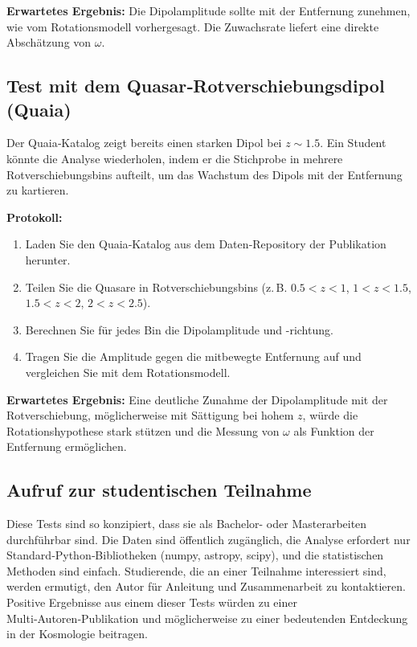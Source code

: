 \documentclass[11pt,a4paper]{article}
\begin{document}
	\textbf{Erwartetes Ergebnis:} Die Dipolamplitude sollte mit der Entfernung zunehmen, wie vom Rotationsmodell vorhergesagt. Die Zuwachsrate liefert eine direkte Abschätzung von \(\omega\).
	
	\subsection{Test mit dem Quasar‑Rotverschiebungsdipol (Quaia)}
	
	Der Quaia‑Katalog \cite{Secrest2025} zeigt bereits einen starken Dipol bei \(z\sim1.5\). Ein Student könnte die Analyse wiederholen, indem er die Stichprobe in mehrere Rotverschiebungsbins aufteilt, um das Wachstum des Dipols mit der Entfernung zu kartieren.
	
	\textbf{Protokoll:}
	\begin{enumerate}
		\item Laden Sie den Quaia‑Katalog aus dem Daten‑Repository der Publikation herunter.
		\item Teilen Sie die Quasare in Rotverschiebungsbins (z. B. \(0.5<z<1\), \(1<z<1.5\), \(1.5<z<2\), \(2<z<2.5\)).
		\item Berechnen Sie für jedes Bin die Dipolamplitude und -richtung.
		\item Tragen Sie die Amplitude gegen die mitbewegte Entfernung auf und vergleichen Sie mit dem Rotationsmodell.
	\end{enumerate}
	
	\textbf{Erwartetes Ergebnis:} Eine deutliche Zunahme der Dipolamplitude mit der Rotverschiebung, möglicherweise mit Sättigung bei hohem \(z\), würde die Rotationshypothese stark stützen und die Messung von \(\omega\) als Funktion der Entfernung ermöglichen.
	
	\subsection{Aufruf zur studentischen Teilnahme}
	
	Diese Tests sind so konzipiert, dass sie als Bachelor- oder Masterarbeiten durchführbar sind. Die Daten sind öffentlich zugänglich, die Analyse erfordert nur Standard‑Python‑Bibliotheken (numpy, astropy, scipy), und die statistischen Methoden sind einfach. Studierende, die an einer Teilnahme interessiert sind, werden ermutigt, den Autor für Anleitung und Zusammenarbeit zu kontaktieren. Positive Ergebnisse aus einem dieser Tests würden zu einer Multi‑Autoren‑Publikation und möglicherweise zu einer bedeutenden Entdeckung in der Kosmologie beitragen.
	
\end{document}
